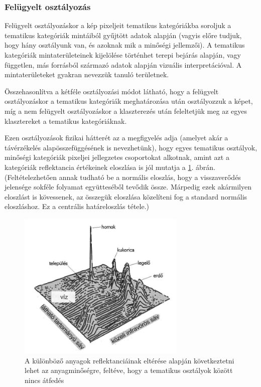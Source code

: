 \documentclass[a4paper,12pt]{article}
\begin{document}
\subsubsection{Felügyelt osztályozás}

Felügyelt osztályozáskor a kép pixeljeit tematikus kategóriákba soroljuk a
tematikus kategóriák mintáiból gyűjtött adatok alapján (vagyis előre tudjuk,
hogy hány osztályunk van, és azoknak mik a minőségi jellemzői). A tematikus
kategóriák mintaterületeinek kijelölése történhet terepi bejárás alapján, vagy
független, más forrásból származó adatok alapján vizuális interpretációval. A
mintaterületeket gyakran nevezzük tanuló területnek. 

Összehasonlítva a kétféle osztályozási módot látható, hogy a felügyelt
osztályozáskor a tematikus kategóriák meghatározása után osztályozzuk a képet,
míg a nem felügyelt osztályozáskor a klaszterezés után feleltetjük meg az egyes
klasztereket a tematikus kategóriáknak.


Ezen osztályozások fizikai hátterét az a megfigyelés adja (amelyet akár a
távérzékelés alapösszefüggésének is nevezhetünk), hogy egyes tematikus
osztályok, minőségi kategóriák pixeljei jellegzetes csoportokat alkotnak, amint
azt a kategóriák reflektancia értékeinek eloszlása is jól mutatja a
\ref{fig:felugyelt_class}. ábrán. (Feltételezhetően annak tudható be a normális
eloszlás, hogy a visszaverődés jelensége sokféle folyamat együtteséből tevődik
össze. Márpedig ezek akármilyen eloszlást is kövessenek, az összegük eloszlása
közelíteni fog a standard normális eloszláshoz. Ez a centrális határeloszlás
tétele.) 


\begin{figure}
	\centering
	\includegraphics[width=8cm]{rs2.png}
	\caption{A különböző anyagok reflektanciáinak eltérése alapján következtetni
		lehet az anyagminőségre, feltéve, hogy a tematikus osztályok
		között nincs átfedés}
	\label{fig:felugyelt_class}
\end{figure}
\end{document}
